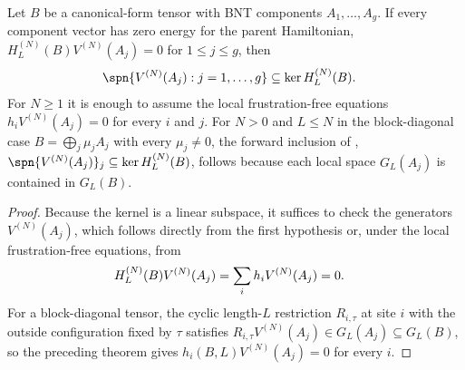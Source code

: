 \begin{lemma}
    \label{lem:bnt_span_le_parent_hamiltonian_kernel}
    \leanok
    Let $B$ be a canonical-form tensor with BNT components
    $A_1,\ldots,A_g$. If every component vector has zero energy for the
    parent Hamiltonian, $H_L^{(N)}(B)V^{(N)}(A_j)=0$ for $1\le j\le g$, then
    \begin{align}
        \spn\{V^{(N)}(A_j):j=1,\ldots,g\}
         & \subseteq
        \ker H_L^{(N)}(B). \notag
    \end{align}
    For $N\ge1$ it is enough to assume the local frustration-free equations
    $h_iV^{(N)}(A_j)=0$ for every $i$ and $j$.
    For $N>0$ and $L\le N$ in the block-diagonal case
    $B=\bigoplus_j\mu_jA_j$ with every $\mu_j\ne0$, the forward inclusion of
    \cite[Definition~3.9]{Cirac2016MPDO_arXiv},
    $\spn\{V^{(N)}(A_j)\}_j \subseteq \ker H_L^{(N)}(B)$, follows because
    each local space $G_L(A_j)$ is contained in $G_L(B)$.
\end{lemma}

\begin{proof}
    \leanok
    Because the kernel is a linear subspace, it suffices to check the
    generators $V^{(N)}(A_j)$, which follows directly from the first hypothesis
    or, under the local frustration-free equations, from
    \begin{align}
        H_L^{(N)}(B)V^{(N)}(A_j)
         & =\sum_i h_iV^{(N)}(A_j) =0. \notag
    \end{align}
    For a block-diagonal tensor, the cyclic length-$L$ restriction $R_{i,\tau}$
    at site $i$ with the outside configuration fixed by $\tau$ satisfies
    $R_{i,\tau}V^{(N)}(A_j) \in G_L(A_j)\subseteq G_L(B)$, so the preceding
    theorem gives $h_i(B,L)V^{(N)}(A_j)=0$ for every $i$.
\end{proof}

